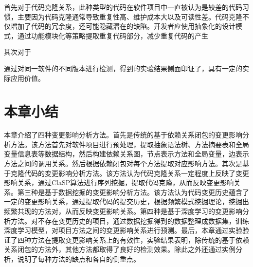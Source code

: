 首先对于代码克隆关系，此种类型的代码在软件项目中一直被认为是较差的代码习惯，主要因为代码克隆通常导致重复性高、维护成本大以及可读性差。代码克隆不仅增加了代码的冗余度，还可能隐藏潜在的缺陷。开发者应使用抽象化的设计模式，通过功能模块化等策略提取重复代码部分，减少重复代码的产生

其次对于


通过对同一软件的不同版本进行检测，得到的实验结果侧面印证了，具有一定的实际应用价值。

\section{本章小结}

本章介绍了四种变更影响分析方法。首先是传统的基于依赖关系闭包的变更影响分析方法。该方法首先对软件项目进行预处理，提取抽象语法树、方法摘要表和全局变量信息表等数据结构，然后构建依赖关系图，节点表示方法和全局变量，边表示方法之间的调用关系。然后根据依赖闭包对每个方法提取对应影响方法。其次是基于克隆代码的变更影响分析方法。该方法认为代码克隆关系一定程度上反映了变更影响关系，通过ClaSP算法进行序列挖掘，提取代码克隆，从而反映变更影响关系。第三种是基于数据挖掘的变更影响分析方法。该方法认为代码变更历史蕴含了一定的变更影响关系，通过提取代码的提交历史，根据频繁模式挖掘理论，挖掘出频繁共现的方法对，从而反映变更影响关系。第四种是基于深度学习的变更影响分析方法。对不存在变更历史的项目，通过数据挖掘得到的数据整理成数据集，训练深度学习模型，对项目方法之间的变更影响关系进行预测。最后，本章通过实验验证了四种方法在提取变更影响关系上的有效性，实验结果表明，除传统的基于依赖关系闭包的方法外，其他方法都取得了良好的检测效果。除此之外还通过实例分析，说明了每种方法的缺点和各自的侧重点。

